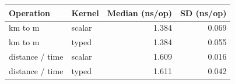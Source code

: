 \begin{tabular}{@{}llrr@{}}
\toprule
Operation & Kernel & Median (ns/op) & SD (ns/op) \\
\midrule
km to m & scalar & 1.384 & 0.069 \\
km to m & typed & 1.384 & 0.055 \\
distance / time & scalar & 1.609 & 0.016 \\
distance / time & typed & 1.611 & 0.042 \\
\bottomrule
\end{tabular}
